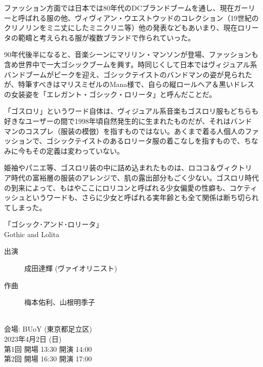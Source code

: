 \documentclass[a6paper, 9pt, openright, titlepage, twoside]{ltjsarticle}
\begin{document}
ファッション方面では日本では80年代のDCブランドブームを通し、現在ガーリーと呼ばれる服の他、ヴィヴィアン・ウエストウッドのコレクション（19世紀のクリノリンをミニ丈にしたミニクリニ等）他の発表などもあいまり、現在ロリータの範疇と考えられる服が複数ブランドで作られていった。

90年代後半になると、音楽シーンにマリリン・マンソンが登場、ファッションも含め世界中で一大ゴシックブームを興す。時同じくして日本ではヴィジュアル系バンドブームがピークを迎え、ゴシックテイストのバンドマンの姿が見られたが、特筆すべきはマリスミゼルのMana様で、自らの縦ロールヘア＆黒いドレスの女装姿を「エレガント・ゴシック・ロリータ」と呼んだことだ。

「ゴスロリ」というワード自体は、ヴィジュアル系音楽もゴスロリ服もどちらも好きなユーザーの間で1998年頃自然発生的に生まれたものだが、それはバンドマンのコスプレ（服装の模倣）を指すものではない。あくまで着る人個人のファッションで、ゴシックテイストのあるロリータ服の着こなしを指すもので、ちなみに今もその定義は変わっていない。

姫袖やパニエ等、ゴスロリ装の中に詰め込まれたものは、ロココ＆ヴィクトリア時代の富裕層の服装のアレンジで、肌の露出部分もごく少ない。ゴスロリ時代の到来によって、もはやここにロリコンと呼ばれる少女偏愛の性癖も、コケティッシュというワードも、さらに少女と呼ばれる実年齢とも全て関係は断ち切られてしまった。



\newpage
\thispagestyle{empty}



\begin{center}
{\Large \ttfamily「ゴシック･アンド･ロリータ」} \\
{\ttfamily Gothic and Lolita} \\
\end{center}

\begin{description}
\item[出演] 成田達輝 (ヴァイオリニスト)
\item[作曲] 梅本佑利、山根明季子 
\end{description}

\noindent \\会場: BUoY (東京都足立区)  \\

\noindent 2023年4月2日 (日)  \\
第1回 開場 13:30 開演 14:00 \\
第2回 開場 16:30 開演 17:00  \\
\end{document}
